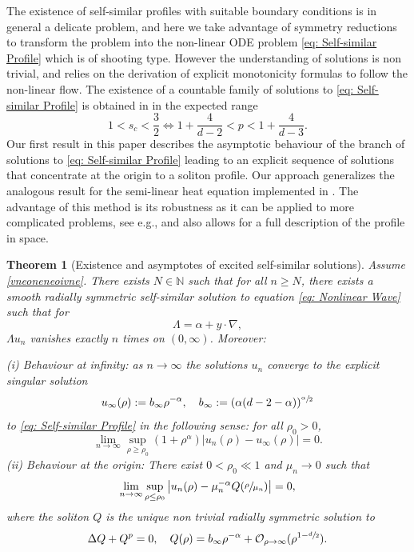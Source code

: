\documentclass[10pt]{article}
\newcommand{\eg}{e.g.}
\theoremstyle{plain}
\newtheorem{theorem}{Theorem}
\theoremstyle{definition}
\begin{document}
The existence of self-similar profiles with suitable boundary conditions is in general a delicate problem, and here we take advantage of symmetry reductions to transform the problem into the non-linear ODE problem \eqref{eq: Self-similar Profile} which is of shooting type. However the understanding of solutions is non trivial, and relies on the derivation of explicit monotonicity formulas to follow the non-linear flow. The existence of a countable family of solutions to \eqref{eq: Self-similar Profile} is obtained in \cite{BMW,DD} in the expected range
\begin{equation}
\label{vneoneneoivne}
1<s_c<\frac{3}{2}\iff 1+\frac{4}{d-2}<p<1+\frac{4}{d-3}.
\end{equation}
Our first result in this paper describes the asymptotic behaviour of the branch of solutions to \eqref{eq: Self-similar Profile} leading to an explicit sequence of solutions that concentrate at the origin to a soliton profile. Our approach generalizes the analogous result for the semi-linear heat equation implemented in \cite{BB,CRS}. The advantage of this method is its robustness as it can be applied to more complicated problems, see \eg \cite{BMR}, and also allows for a full description of the profile in space.

\begin{theorem}[Existence and asymptotes of excited self-similar solutions]
\label{theo: Result 1}
Assume \eqref{vneoneneoivne}. There exists $N\in\mathbb N$ such that for all $n\ge N$, there exists a smooth radially symmetric self-similar solution to equation \eqref{eq: Nonlinear Wave} such that for
\[
\Lambda = \alpha+y\cdot \nabla,
\]
$\Lambda u_n$ vanishes exactly $n$ times on $(0,\infty)$. Moreover:

\emph{(i) Behaviour at infinity:} as $n\to \infty$ the solutions $u_n$ converge to the explicit singular solution
\[
u_\infty(\rho):=b_\infty\rho^{-\alpha}, \quad b_\infty:=(\alpha(d-2-\alpha))^{\sfrac{\alpha}{2}}
\]
to \eqref{eq: Self-similar Profile} in the following sense: for all $\rho_0>0$,
\[
\lim_{n\to \infty }\sup_{\rho\ge\rho_0}(1+\rho^\alpha)|u_n(\rho)-u_\infty(\rho)|=0.
\]
\emph{(ii) Behaviour at the origin:} There exist $0<\rho_0\ll1 $ and $\mu_n\to 0$ such that
\[
\lim_{n\to \infty }\sup_{\rho\le\rho_0}\big|u_n(\rho)-\mu_n^{-\alpha}Q(\sfrac{\rho}{\mu_n})\big|=0,
\]
where the soliton $Q$ is the unique non trivial radially symmetric solution to
\[
\Delta Q+Q^p=0,\quad Q(\rho)=b_\infty\rho^{-\alpha}+\mathcal O_{\rho\to\infty } (\rho^{1-\sfrac{d}{2}}).
\]
\end{theorem}
\end{document}
